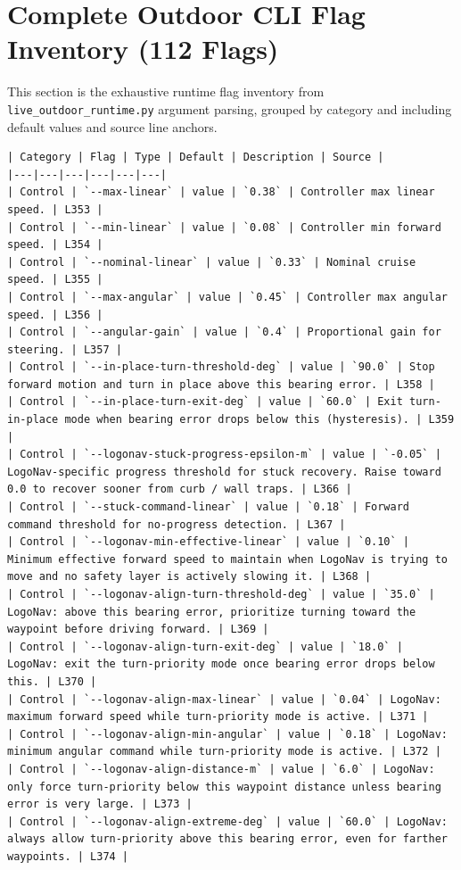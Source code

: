 \documentclass[11pt]{article}
\begin{document}
\section{Complete Outdoor CLI Flag Inventory (112 Flags)}

This section is the exhaustive runtime flag inventory from
\texttt{live\_outdoor\_runtime.py} argument parsing, grouped by category and including
default values and source line anchors.

\begin{lstlisting}
| Category | Flag | Type | Default | Description | Source |
|---|---|---|---|---|---|
| Control | `--max-linear` | value | `0.38` | Controller max linear speed. | L353 |
| Control | `--min-linear` | value | `0.08` | Controller min forward speed. | L354 |
| Control | `--nominal-linear` | value | `0.33` | Nominal cruise speed. | L355 |
| Control | `--max-angular` | value | `0.45` | Controller max angular speed. | L356 |
| Control | `--angular-gain` | value | `0.4` | Proportional gain for steering. | L357 |
| Control | `--in-place-turn-threshold-deg` | value | `90.0` | Stop forward motion and turn in place above this bearing error. | L358 |
| Control | `--in-place-turn-exit-deg` | value | `60.0` | Exit turn-in-place mode when bearing error drops below this (hysteresis). | L359 |
| Control | `--logonav-stuck-progress-epsilon-m` | value | `-0.05` | LogoNav-specific progress threshold for stuck recovery. Raise toward 0.0 to recover sooner from curb / wall traps. | L366 |
| Control | `--stuck-command-linear` | value | `0.18` | Forward command threshold for no-progress detection. | L367 |
| Control | `--logonav-min-effective-linear` | value | `0.10` | Minimum effective forward speed to maintain when LogoNav is trying to move and no safety layer is actively slowing it. | L368 |
| Control | `--logonav-align-turn-threshold-deg` | value | `35.0` | LogoNav: above this bearing error, prioritize turning toward the waypoint before driving forward. | L369 |
| Control | `--logonav-align-turn-exit-deg` | value | `18.0` | LogoNav: exit the turn-priority mode once bearing error drops below this. | L370 |
| Control | `--logonav-align-max-linear` | value | `0.04` | LogoNav: maximum forward speed while turn-priority mode is active. | L371 |
| Control | `--logonav-align-min-angular` | value | `0.18` | LogoNav: minimum angular command while turn-priority mode is active. | L372 |
| Control | `--logonav-align-distance-m` | value | `6.0` | LogoNav: only force turn-priority below this waypoint distance unless bearing error is very large. | L373 |
| Control | `--logonav-align-extreme-deg` | value | `60.0` | LogoNav: always allow turn-priority above this bearing error, even for farther waypoints. | L374 |

\end{lstlisting}
\end{document}
